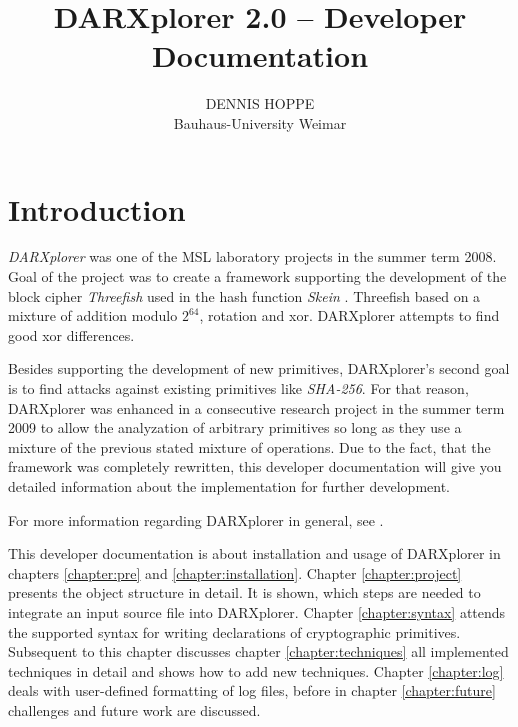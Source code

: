 \documentclass{acmtrans2m}
\title{DARXplorer 2.0 -- Developer Documentation}
\author{DENNIS HOPPE\\
      Bauhaus-University Weimar 
}
\begin{document}
    
\maketitle

%
%
\section{Introduction}
\label{section:einleitung}

\textit{DARXplorer} was one of the MSL laboratory projects in the summer term 2008.
Goal of the project was to create a framework supporting the development of the block 
cipher \textit{Threefish} \cite{Anonymous:2008p2963} used in the hash function \textit{Skein} \cite{Whiting:2009p11767}. Threefish based on a
mixture of addition modulo $2^{64}$, rotation and xor. DARXplorer attempts to find good xor differences.

Besides supporting the development of new primitives, DARXplorer's second goal is to find attacks against existing primitives like \textit{SHA-256}. For that reason, DARXplorer
was enhanced in a consecutive research project in the summer term 2009 to allow the analyzation of arbitrary primitives so long as they use a mixture of the previous stated mixture of operations. Due to the fact, that the framework was completely rewritten, this 
developer documentation will give you detailed information about the 
implementation for further development.

For more information regarding DARXplorer in general, see .

\bigbreak

This developer documentation is about installation and usage of DARXplorer in chapters \ref{chapter:pre} and \ref{chapter:installation}. Chapter \ref{chapter:project} presents the object
structure in detail. It is shown, which steps are needed to integrate an input source file into
DARXplorer. Chapter \ref{chapter:syntax} attends the supported syntax for writing
declarations of cryptographic primitives. Subsequent to this chapter discusses chapter
\ref{chapter:techniques} all implemented techniques in detail and shows how to
add new techniques. Chapter \ref{chapter:log} deals with user-defined formatting
of log files, before in chapter \ref{chapter:future} challenges and future work are discussed.
\end{document}
